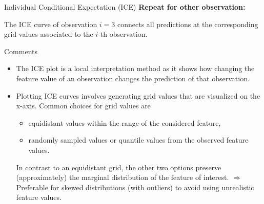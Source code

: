 \documentclass[11pt,compress,t,notes=noshow, xcolor=table]{beamer}
\begin{document}
\begin{vbframe}{Individual Conditional Expectation (ICE)}
\textbf{Repeat for other observation:}

The ICE curve of observation $i=3$ connects all predictions at the corresponding grid values associated to the $i$-th observation.
\end{vbframe}


\begin{vbframe}{Comments}
\begin{itemize}
\item The ICE plot is a local interpretation method as it shows how changing the feature value of an observation changes the prediction of that observation.
\item Plotting ICE curves involves generating grid values that are visualized on the x-axis.
Common choices for grid values are
\begin{itemize}
\item equidistant values within the range of the considered feature,
\item randomly sampled values or quantile values from the observed feature values.
\end{itemize}
In contrast to an equidistant grid, the other two options preserve (approximately) the marginal distribution of the feature of interest.
$\Rightarrow$ Preferable for skewed distributions (with outliers) to avoid using unrealistic feature values.
\end{itemize}
\end{vbframe}

\endlecture
\end{document}
